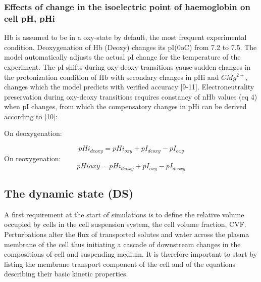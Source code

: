 \documentclass[a4paper]{article}
\begin{document}
\subsubsection{Effects of change in the isoelectric point of haemoglobin on cell pH, pHi}
Hb is assumed to be in a oxy-state by default, the most frequent experimental condition. Deoxygenation of Hb (Deoxy) changes its pI(0oC) from 7.2 to 7.5.  The model automatically adjusts the actual pI change for the temperature of the experiment.  The pI shifts during oxy-deoxy transitions cause sudden changes in the protonization condition of Hb with secondary changes in pHi and $CMg^{2+}$, changes which the model predicts with verified accuracy [9-11].  Electroneutrality preservation during oxy-deoxy transitions requires constancy of nHb values (eq 4) when pI changes, from which the compensatory changes in pHi can be derived according to [10]: 

On deoxygenation:

\setcounter{equation}{0}
\renewcommand{\theequation}{4.\alph{equation}}
\begin{equation}
pHi_{deoxy} = pHi_{oxy} + pI_{deoxy} - pI_{oxy} 
\end{equation}
On reoxygenation:
\begin{equation}
pHioxy = pHi_{deoxy} + pI_{oxy} - pI_{deoxy} 
\end{equation}

\subsection{The dynamic state (DS)}

\setcounter{equation}{9}
\renewcommand{\theequation}{\arabic{equation}}

A first requirement at the start of simulations is to define the relative volume occupied by cells in the cell suspension system, the cell volume fraction, CVF.  Perturbations alter the flux of transported solutes and water across the plasma membrane of the cell thus initiating a cascade of downstream changes in the compositions of cell and suspending medium.  It is therefore important to start by listing the membrane transport component of the cell and of the equations describing their basic kinetic properties.  
\end{document}

